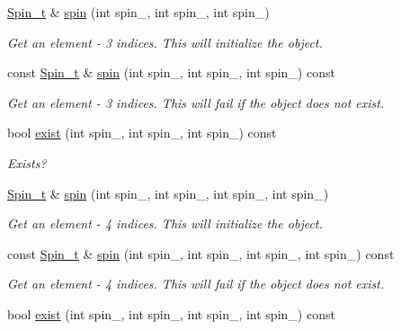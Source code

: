 \begin{DoxyCompactItemize}
\mbox{\hyperlink{structHadron_1_1HadronDistOperatorRep__t_1_1Spin__t}{Spin\+\_\+t}} \& \mbox{\hyperlink{classHadron_1_1HadronDistOperatorRep__t_a215985252fdaecbbecab777de4591cd4}{spin}} (int spin\+\_, int spin\+\_, int spin\+\_)
\begin{DoxyCompactList}\small\item\em Get an element -\/ 3 indices. This will initialize the object. \end{DoxyCompactList}\item 
const \mbox{\hyperlink{structHadron_1_1HadronDistOperatorRep__t_1_1Spin__t}{Spin\+\_\+t}} \& \mbox{\hyperlink{classHadron_1_1HadronDistOperatorRep__t_a436620dfee9ff1c98febcc5ae7b0ff3a}{spin}} (int spin\+\_, int spin\+\_, int spin\+\_) const
\begin{DoxyCompactList}\small\item\em Get an element -\/ 3 indices. This will fail if the object does not exist. \end{DoxyCompactList}\item 
bool \mbox{\hyperlink{classHadron_1_1HadronDistOperatorRep__t_a1ae795fcc4b7bc12cadef8f26884cee3}{exist}} (int spin\+\_, int spin\+\_, int spin\+\_) const
\begin{DoxyCompactList}\small\item\em Exists? \end{DoxyCompactList}\item 
\mbox{\hyperlink{structHadron_1_1HadronDistOperatorRep__t_1_1Spin__t}{Spin\+\_\+t}} \& \mbox{\hyperlink{classHadron_1_1HadronDistOperatorRep__t_a42ba0b0eff80de32178f0cee67dcbfa1}{spin}} (int spin\+\_, int spin\+\_, int spin\+\_, int spin\+\_)
\begin{DoxyCompactList}\small\item\em Get an element -\/ 4 indices. This will initialize the object. \end{DoxyCompactList}\item 
const \mbox{\hyperlink{structHadron_1_1HadronDistOperatorRep__t_1_1Spin__t}{Spin\+\_\+t}} \& \mbox{\hyperlink{classHadron_1_1HadronDistOperatorRep__t_a61528fe44909a8f4926e21b54681c1e0}{spin}} (int spin\+\_, int spin\+\_, int spin\+\_, int spin\+\_) const
\begin{DoxyCompactList}\small\item\em Get an element -\/ 4 indices. This will fail if the object does not exist. \end{DoxyCompactList}\item 
bool \mbox{\hyperlink{classHadron_1_1HadronDistOperatorRep__t_affb8fd51f21253d65fcc02b6517fd593}{exist}} (int spin\+\_, int spin\+\_, int spin\+\_, int spin\+\_) const

\end{DoxyCompactItemize}
